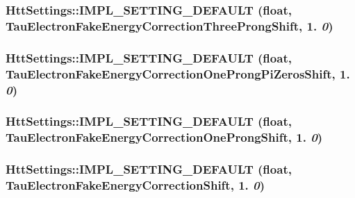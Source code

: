 \label{classHttSettings_a7a50f923a076ad48c0a43d64124fc9e2}
\hypertarget{classHttSettings_ababa9276adbac2fb90ebb2c502ef3976}{
\subsubsection[{IMPL\_\-SETTING\_\-DEFAULT}]{\setlength{\rightskip}{0pt plus 5cm}HttSettings::IMPL\_\-SETTING\_\-DEFAULT (float, \/  TauElectronFakeEnergyCorrectionThreeProngShift, \/  1. {\em 0})}}
\label{classHttSettings_ababa9276adbac2fb90ebb2c502ef3976}
\hypertarget{classHttSettings_a70ec2ba6c5823ecd784b3cc84582592c}{
\subsubsection[{IMPL\_\-SETTING\_\-DEFAULT}]{\setlength{\rightskip}{0pt plus 5cm}HttSettings::IMPL\_\-SETTING\_\-DEFAULT (float, \/  TauElectronFakeEnergyCorrectionOneProngPiZerosShift, \/  1. {\em 0})}}
\label{classHttSettings_a70ec2ba6c5823ecd784b3cc84582592c}
\hypertarget{classHttSettings_a7fa9710a76d1e33edb134b1da8b8308f}{
\subsubsection[{IMPL\_\-SETTING\_\-DEFAULT}]{\setlength{\rightskip}{0pt plus 5cm}HttSettings::IMPL\_\-SETTING\_\-DEFAULT (float, \/  TauElectronFakeEnergyCorrectionOneProngShift, \/  1. {\em 0})}}
\label{classHttSettings_a7fa9710a76d1e33edb134b1da8b8308f}
\hypertarget{classHttSettings_ac5326a137aaeaacb3ac8bb41f7f57d4f}{
\subsubsection[{IMPL\_\-SETTING\_\-DEFAULT}]{\setlength{\rightskip}{0pt plus 5cm}HttSettings::IMPL\_\-SETTING\_\-DEFAULT (float, \/  TauElectronFakeEnergyCorrectionShift, \/  1. {\em 0})}}

